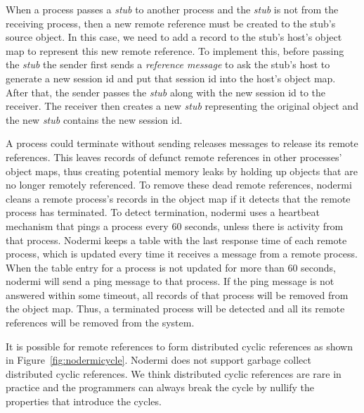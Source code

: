 When a process passes a \emph{stub} to another process and the \emph{stub}
is not from the receiving process, then a new remote reference must be created
to the stub's source object.  In this case, we need to add a record to
the stub's host's object map to represent this new remote reference.
To implement this, before passing the \emph{stub} the sender first
sends a \emph{reference message} to ask the stub's host to generate a
new session id and put that session id into the host's object map.  After
that, the sender passes the \emph{stub} along with the new session id to
the receiver.  The receiver then creates a new \emph{stub} representing
the original object and the new \emph{stub} contains the new session id.

A process could terminate without sending releases messages to release
its remote references.  This leaves records of defunct remote references
in other processes' object maps, thus creating potential memory leaks by
holding up objects that are no longer remotely referenced.  To remove
these dead remote references, nodermi cleans a remote process's records
in the object map if it detects that the remote process has terminated.
To detect termination, nodermi uses a heartbeat mechanism that pings
a process every 60 seconds, unless there is activity from that process.
Nodermi keeps a table with the last response time of each remote process,
which is updated every time it receives a message from a
remote process.  When the table entry for a process is not updated for
more than 60 seconds, nodermi will send a ping message to that process.
If the ping message is not answered within some timeout, all records of that
process will be removed from the object map.  Thus, a terminated process
will be detected and all its remote references will be removed from the system.

\nodrmicyclefig{}

It is possible for remote references to form distributed cyclic references as shown
in Figure~\ref{fig:nodermicycle}.
Nodermi does not support garbage collect distributed cyclic references.
We think distributed cyclic references are rare in practice and the
programmers can always break the cycle by nullify the properties
that introduce the cycles.




